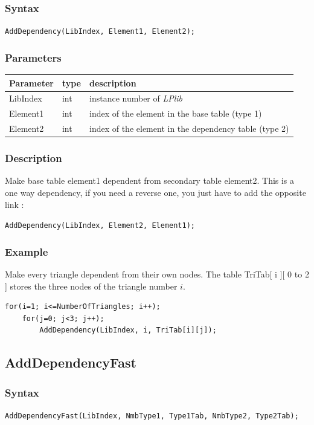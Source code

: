 \documentclass[a4paper,12pt]{article}
\begin{document}
\subsubsection*{Syntax}
\tt{AddDependency(LibIndex, Element1, Element2);}
\normalfont

\subsubsection*{Parameters}
\begin{tabular}{|m{2cm}|m{1.5cm}|m{10.5cm}|}
\hline
Parameter  & type   & description \\
\hline
LibIndex   & int    & instance number of \emph{LPlib} \\
\hline
Element1   & int    & index of the element in the base table (type 1) \\
\hline
Element2   & int    & index of the element in the dependency table (type 2) \\
\hline
\end{tabular}

\subsubsection*{Description}
Make base table element1 dependent from secondary table element2. This is a one way dependency, if you need a reverse one, you just have to add the opposite link :
\medskip

\tt{AddDependency(LibIndex, Element2, Element1);}
\normalfont

\subsubsection*{Example}
Make every triangle dependent from their own nodes. The table TriTab[ i ][ 0 to 2 ] stores the three nodes of the triangle number $i$.

\begin{tt}
\begin{verbatim}
for(i=1; i<=NumberOfTriangles; i++);
    for(j=0; j<3; j++);
        AddDependency(LibIndex, i, TriTab[i][j]);
\end{verbatim}
\end{tt}
\normalfont


\subsection{AddDependencyFast}

\subsubsection*{Syntax}
\tt{AddDependencyFast(LibIndex, NmbType1, Type1Tab, NmbType2, Type2Tab);}
\normalfont
\end{document}
